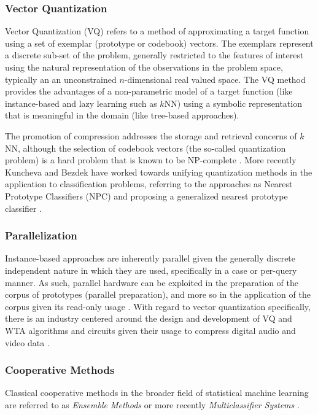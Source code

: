 \documentclass[a4paper, 11pt]{article}
\begin{document}
\subsubsection{Vector Quantization}
Vector Quantization (VQ) refers to a method of approximating a target function using a set of exemplar (prototype or codebook) vectors. The exemplars represent a discrete sub-set of the problem, generally restricted to the features of interest using the natural representation of the observations in the problem space, typically an an unconstrained $n$-dimensional real valued space. The VQ method provides the advantages of a non-parametric model of a target function (like instance-based and lazy learning such as $k$NN) using a symbolic representation that is meaningful in the domain (like tree-based approaches). 

The promotion of compression addresses the storage and retrieval concerns of $k$NN, although the selection of codebook vectors (the so-called quantization problem) is a hard problem that is known to be NP-complete \cite{Garey1982}. More recently Kuncheva and Bezdek have worked towards unifying quantization methods in the application to classification problems, referring to the approaches as Nearest Prototype Classifiers (NPC) and proposing a generalized nearest prototype classifier \cite{Kuncheva1998, Kuncheva1998a}.
	
\subsubsection{Parallelization} 
Instance-based approaches are inherently parallel given the generally discrete independent nature in which they are used, specifically in a case or per-query manner. As such, parallel hardware can be exploited in the preparation of the corpus of prototypes (parallel preparation), and more so in the application of the corpus given its read-only usage \cite{Aamodt1994, Nagendra1996, Plaza1997}. With regard to vector quantization specifically, there is an industry centered around the design and development of VQ and WTA algorithms and circuits given their usage to compress digital audio and video data \cite{Nakada1999, Parhi1994}.
	
\subsubsection{Cooperative Methods}
Classical cooperative methods in the broader field of statistical machine learning are referred to as \emph{Ensemble Methods} \cite{Opitz1999, Polikar2006} or more recently \emph{Multiclassifier Systems} \cite{Ghosh2002}. 
\end{document}

